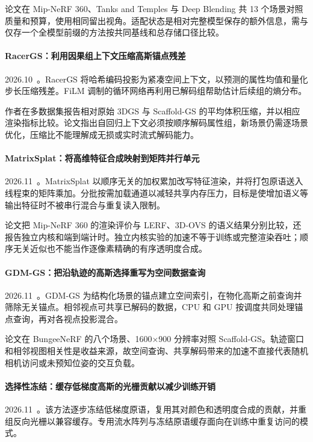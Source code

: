 论文在 Mip-NeRF 360、Tanks and Temples 与 Deep Blending 共 13 个场景对照质量和预算，使用相同留出视角。适配状态是相对完整模型保存的额外信息，需与仅存一个全模型前缀的方法按共同基线和总存储口径比较。

\paragraph{RacerGS：利用因果组上下文压缩高斯锚点残差}
2026.10~\cite{2610_34263}。RacerGS 将哈希编码投影为紧凑空间上下文，以预测的属性均值和量化步长压缩残差。FiLM 调制的循环网络再利用已解码组帮助估计后续组的熵分布。

作者在多数据集报告相对原始 3DGS 与 Scaffold-GS 的平均体积压缩，并以相应渲染指标比较。论文指出自回归上下文必须按顺序解码属性组，新场景仍需逐场景优化，压缩比不能理解成无损或实时流式解码能力。

\paragraph{MatrixSplat：将高维特征合成映射到矩阵并行单元}
2026.11~\cite{2611_15153}。MatrixSplat 以顺序无关的加权累加改写特征渲染，并将打包原语送入线程束的矩阵乘加。分批按需加载通道以减轻共享内存压力，目标是使增加语义等输出特征时不被串行混合与重复读入限制。

论文把 Mip-NeRF 360 的渲染评价与 LERF、3D-OVS 的语义结果分别比较，还报告独立内核和端到端计时。独立内核实验的加速不等于训练或完整渲染吞吐；顺序无关近似也不能当作逐像素精确的有序透明度合成。

\paragraph{GDM-GS：把沿轨迹的高斯选择重写为空间数据查询}
2026.11~\cite{2611_20546}。GDM-GS 为结构化场景的锚点建立空间索引，在物化高斯之前查询并筛除无关锚点。相邻视点可共享已解码的数据，CPU 和 GPU 按调度共同处理锚点查询，再对各视点投影混合。

论文在 BungeeNeRF 的八个场景、1600×900 分辨率对照 Scaffold-GS。轨迹窗口和相邻视图相关性是收益来源，故空间查询、共享解码带来的加速不直接代表随机相机访问或未预知位姿的交互负载。

\paragraph{选择性冻结：缓存低梯度高斯的光栅贡献以减少训练开销}
2026.11~\cite{2611_22059}。该方法逐步冻结低梯度原语，复用其对颜色和透明度合成的贡献，并重组反向光栅以兼容缓存。专用流水阵列与冻结原语缓存面向在训练中重复访问的模式。

